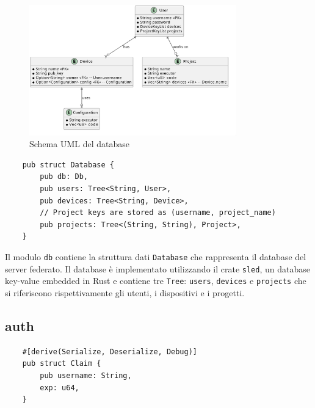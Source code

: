 \begin{figure}[H]
    \centering
    \includegraphics[width=0.8\textwidth]{images/chapter6/uml-db.png}
    \caption{ Schema UML del database }
    \label{fig:blender}
  \end{figure}

\begin{listing}[H]
    \begin{verbatim}
    pub struct Database {
        pub db: Db,
        pub users: Tree<String, User>,
        pub devices: Tree<String, Device>,
        // Project keys are stored as (username, project_name)
        pub projects: Tree<(String, String), Project>,
    }
\end{verbatim}
\end{listing}

Il modulo \texttt{db} contiene la struttura dati \texttt{Database} che rappresenta il database del server federato.
Il database è implementato utilizzando il crate \texttt{sled}, un database key-value embedded in Rust e contiene tre \texttt{Tree}:
\texttt{users}, \texttt{devices} e \texttt{projects} che si riferiscono rispettivamente gli utenti, i dispositivi e i progetti.

\subsection{auth}

\begin{listing}[H]
    \begin{verbatim}
    #[derive(Serialize, Deserialize, Debug)]
    pub struct Claim {
        pub username: String,
        exp: u64,
    }
    \end{verbatim}
\end{listing}

